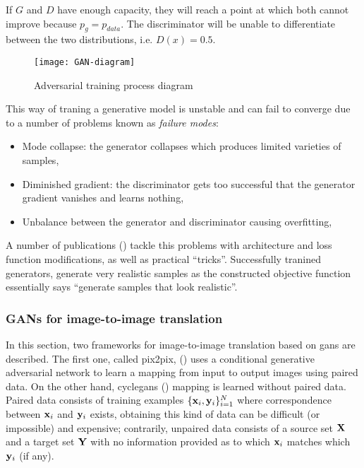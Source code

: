 \documentclass[../main.tex]{subfiles}
\begin{document}
If $G$ and $D$ have enough capacity, they will reach a point at which both cannot
improve because $p_g = p_{data}$.
The discriminator will be unable to differentiate between the two distributions,
i.e. $D(x) = 0.5$.

\begin{figure}[H]
\centering
\texttt{[image: GAN-diagram]}
\caption{Adversarial training process diagram}
\label{fig:gan-diagram}
\end{figure}

This way of traning a generative model is unstable and can fail to converge due
to a number of problems known as \emph{failure modes}:
\begin{itemize}
  \item Mode collapse: the generator collapses which produces limited varieties
  of samples,
  \item Diminished gradient: the discriminator gets too successful that the
  generator gradient vanishes and learns nothing,
  \item Unbalance between the generator and discriminator causing overfitting,
\end{itemize}

A number of publications
(\cite{Arjovsky2017,miyato2018spectral,DBLP:journals/corr/SalimansGZCRC16})
tackle this problems with architecture and loss function modifications, as well as
practical ``tricks''.
Successfully tranined generators, generate
very realistic samples as the constructed objective function essentially says
``generate samples that look realistic''.

\subsubsection{GANs for image-to-image translation}
\label{sec:gans-translation}

In this section, two frameworks for image-to-image translation based on \gls{gans}
are described. The first one, called pix2pix, (\cite{Isola2016}) uses a
conditional generative adversarial network to learn a mapping from input to
output images using paired data.
On the other hand, \gls{cyclegans} (\cite{Zhu2017a}) mapping is learned
without paired data.
Paired data consists of training examples
$\{\mathbf{x}_i, \mathbf{y}_i\}_{i=1}^N$
where correspondence between $\mathbf{x}_i$ and $\mathbf{y}_i$ exists, obtaining
this kind of data can be difficult (or impossible) and expensive; contrarily,
unpaired data consists of a source set $\mathbf{X}$ and a target set $\mathbf{Y}$
with no information provided as to which $\mathbf{x}_i$ matches which
$\mathbf{y}_i$ (if any).
\end{document}
